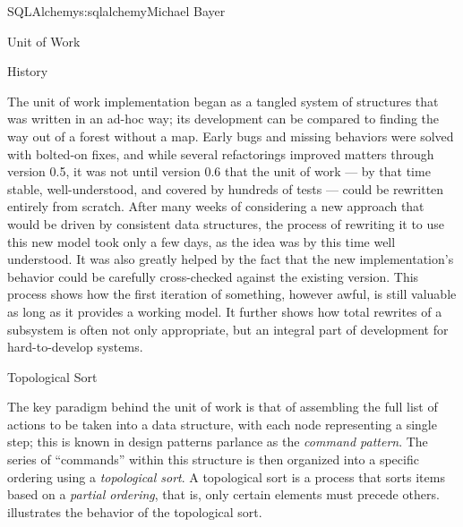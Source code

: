 \begin{aosachapter}{SQLAlchemy}{s:sqlalchemy}{Michael Bayer}
\begin{aosasect1}{Unit of Work}
\begin{aosasect2}{History}

The unit of work implementation began as a tangled system of structures that
was written in an ad-hoc way; its development can be compared to finding
the way out of a forest without a map. Early bugs and missing behaviors were
solved with bolted-on fixes, and while several refactorings improved matters
through version 0.5, it was not until version 0.6 that the unit of work --- by
that time stable, well-understood, and covered by hundreds of tests --- could be
rewritten entirely from scratch.  After many weeks of considering a new
approach that would be driven by consistent data structures, the process of
rewriting it to use this new model took only a few days, as the idea was
by this time well understood.  It was also
greatly helped by the fact that the new implementation's behavior could be
carefully cross-checked against the existing version. This process shows how
the first iteration of something, however awful, is still valuable as long as
it provides a working model.  It further shows how total rewrites of a subsystem
is often not only appropriate, but an integral part of development for
hard-to-develop systems.

\end{aosasect2}

\begin{aosasect2}{Topological Sort}

The key paradigm behind the unit of work is that of assembling the full list of
actions to be taken into a data structure, with each node representing a single step;
this is known in design patterns parlance as the \emph{command pattern}.   The series of
``commands'' within this structure is then organized into a specific ordering
using a \emph{topological sort}.   A topological sort is a process that sorts items based on a \emph{partial ordering},
that is, only certain elements must precede others.   illustrates the
behavior of the topological sort.



\end{aosasect2}
\end{aosasect1}
\end{aosachapter}
